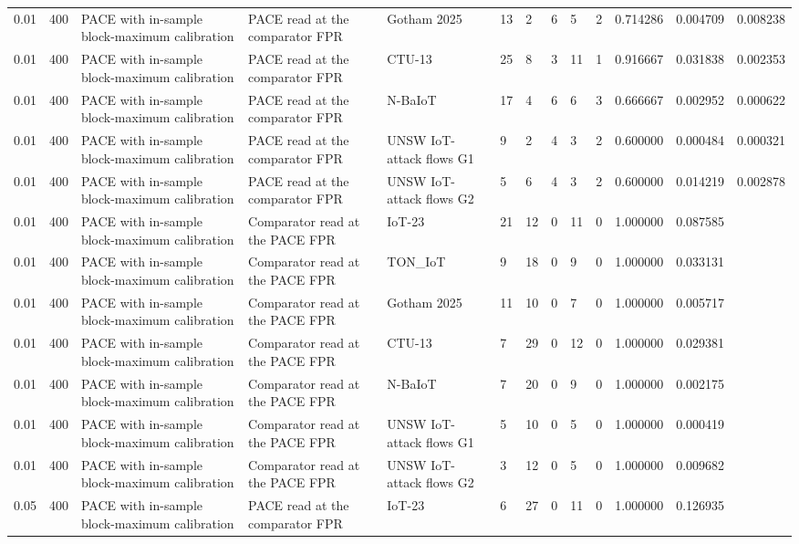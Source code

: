 \begin{tabular}{lllllllllllll}
0.01 & 400 & PACE with in-sample block-maximum calibration & PACE read at the comparator FPR & Gotham 2025 & 13 & 2 & 6 & 5 & 2 & 0.714286 & 0.004709 & 0.008238 \\
0.01 & 400 & PACE with in-sample block-maximum calibration & PACE read at the comparator FPR & CTU-13 & 25 & 8 & 3 & 11 & 1 & 0.916667 & 0.031838 & 0.002353 \\
0.01 & 400 & PACE with in-sample block-maximum calibration & PACE read at the comparator FPR & N-BaIoT & 17 & 4 & 6 & 6 & 3 & 0.666667 & 0.002952 & 0.000622 \\
0.01 & 400 & PACE with in-sample block-maximum calibration & PACE read at the comparator FPR & UNSW IoT-attack flows G1 & 9 & 2 & 4 & 3 & 2 & 0.600000 & 0.000484 & 0.000321 \\
0.01 & 400 & PACE with in-sample block-maximum calibration & PACE read at the comparator FPR & UNSW IoT-attack flows G2 & 5 & 6 & 4 & 3 & 2 & 0.600000 & 0.014219 & 0.002878 \\
0.01 & 400 & PACE with in-sample block-maximum calibration & Comparator read at the PACE FPR & IoT-23 & 21 & 12 & 0 & 11 & 0 & 1.000000 & 0.087585 &  \\
0.01 & 400 & PACE with in-sample block-maximum calibration & Comparator read at the PACE FPR & TON\_IoT & 9 & 18 & 0 & 9 & 0 & 1.000000 & 0.033131 &  \\
0.01 & 400 & PACE with in-sample block-maximum calibration & Comparator read at the PACE FPR & Gotham 2025 & 11 & 10 & 0 & 7 & 0 & 1.000000 & 0.005717 &  \\
0.01 & 400 & PACE with in-sample block-maximum calibration & Comparator read at the PACE FPR & CTU-13 & 7 & 29 & 0 & 12 & 0 & 1.000000 & 0.029381 &  \\
0.01 & 400 & PACE with in-sample block-maximum calibration & Comparator read at the PACE FPR & N-BaIoT & 7 & 20 & 0 & 9 & 0 & 1.000000 & 0.002175 &  \\
0.01 & 400 & PACE with in-sample block-maximum calibration & Comparator read at the PACE FPR & UNSW IoT-attack flows G1 & 5 & 10 & 0 & 5 & 0 & 1.000000 & 0.000419 &  \\
0.01 & 400 & PACE with in-sample block-maximum calibration & Comparator read at the PACE FPR & UNSW IoT-attack flows G2 & 3 & 12 & 0 & 5 & 0 & 1.000000 & 0.009682 &  \\
0.05 & 400 & PACE with in-sample block-maximum calibration & PACE read at the comparator FPR & IoT-23 & 6 & 27 & 0 & 11 & 0 & 1.000000 & 0.126935 &  \\

\end{tabular}
